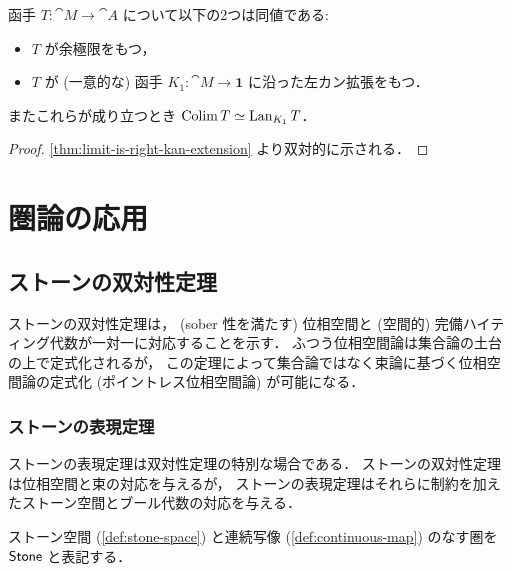 \documentclass[titlepage]{ltjsreport}
\begin{document}
\begin{theorem}[余極限は左カン拡張である]
  函手 $T:\cat{M}\to\cat{A}$ について以下の2つは同値である:
  \begin{itemize}
    \item $T$ が余極限をもつ，
    \item $T$ が (一意的な) 函手 $K_1:\cat{M}\to\mathbf{1}$
          に沿った左カン拡張をもつ．
  \end{itemize}
  またこれらが成り立つとき $\operatorname{Colim} T\simeq\operatorname{Lan}_{K_1}T$．
\end{theorem}

\begin{proof}
  \cref{thm:limit-is-right-kan-extension} より双対的に示される．
\end{proof}

\begin{center}
  \begin{minipage}[b]{0.4\linewidth}
    
  \end{minipage}
  \begin{minipage}[b]{0.4\linewidth}
    
  \end{minipage}
\end{center}

\chapter{圏論の応用}

\section{ストーンの双対性定理}

ストーンの双対性定理は，
(sober 性を満たす)
位相空間と
(空間的)
完備ハイティング代数が一対一に対応することを示す．
ふつう位相空間論は集合論の土台の上で定式化されるが，
この定理によって集合論ではなく束論に基づく位相空間論の定式化
(ポイントレス位相空間論)
が可能になる．

\subsection{ストーンの表現定理}

ストーンの表現定理は双対性定理の特別な場合である．
ストーンの双対性定理は位相空間と束の対応を与えるが，
ストーンの表現定理はそれらに制約を加えたストーン空間とブール代数の対応を与える．

\begin{definition}[ストーン空間の圏]
  ストーン空間
  (\cref{def:stone-space})
  と連続写像
  (\cref{def:continuous-map})
  のなす圏を $\mathsf{Stone}$ と表記する．
\end{definition}
\end{document}
